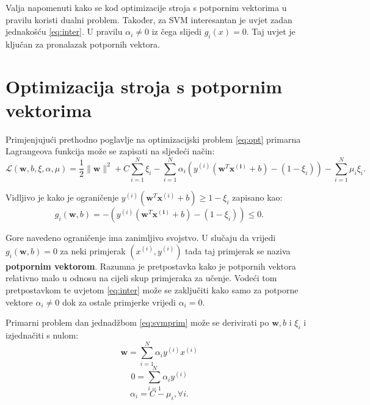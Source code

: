 \documentclass[times, utf8, zavrsni, numeric]{fer}
\begin{document}
Valja napomenuti kako se kod optimizacije stroja s potpornim vektorima u pravilu koristi dualni problem.
Također, za SVM interesantan je uvjet zadan jednakošću \ref{eq:inter}. U pravilu $\alpha_i \neq 0$ iz čega
slijedi $g_i(x) = 0$. Taj uvjet je ključan za pronalazak potpornih vektora.

\section{Optimizacija stroja s potpornim vektorima}
Primjenjujući prethodno poglavlje na optimizacijski problem \ref{eq:opt} primarna Lagrangeova funkcija
može se zapisati
na sljedeći način:
\begin{equation} \label{eq:svmprim}
  \mathcal{L}(\mathbf{w}, b, \xi,\alpha, \mu) = \frac{1}{2}\|\mathbf{w}\|^2 + C\sum_{i=1}^{N} \xi_i
  - \sum_{i=1}^{N} \alpha_i(y^{(i)}(\mathbf{w}^T\mathbf{x^{(i)}} + b) - (1 - \xi_i))
  - \sum_{i=1}^{N} \mu_i\xi_i.
\end{equation}

Vidljivo je kako je ograničenje $y^{(i)}(\mathbf{w}^T\mathbf{x}^{(i)} + b) \geq 1 - \xi_i$ zapisano
kao:
\begin{equation*}
  g_i(\mathbf{w}, b) = - (y^{(i)}(\mathbf{w}^T\mathbf{x^{(i)}} + b) - (1 - \xi_i)) \leq 0.
\end{equation*}

Gore navedeno ograničenje ima zanimljivo svojstvo. 
U slučaju da vrijedi $g_i(\mathbf{w}, b) = 0$ za neki primjerak $(x^{(i)}, y^{(i)})$ tada
taj primjerak se naziva \textbf{potpornim vektorom}. Razumna je pretpostavka kako je potpornih vektora 
relativno malo u odnosu na cijeli skup primjeraka za učenje. Vodeći tom pretpostavkom te uvjetom \ref{eq:inter}
može se zaključiti kako samo za potporne vektore $\alpha_i \neq 0$ dok za ostale primjerke vrijedi 
$\alpha_i = 0$.

\par Primarni problem dan jednadžbom \ref{eq:svmprim} može se derivirati po $\mathbf{w}, b$ i $\xi_i$
i izjednačiti s nulom:
\begin{equation}
  \mathbf{w} = \sum_{i=1}^{N} \alpha_iy^{(i)}x^{(i)}
\end{equation}
\begin{equation} \label{eq:dualcomp}
  0 = \sum_{i=1}^{N} \alpha_iy^{(i)}
\end{equation} 
\begin{equation}
  \alpha_i = C - \mu_i, \forall i.
\end{equation}
\end{document}
